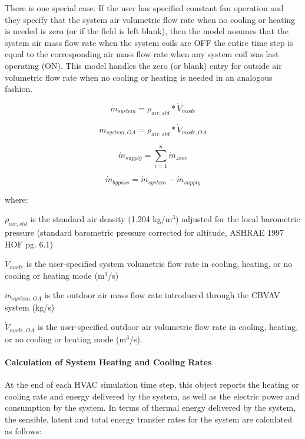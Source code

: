 There is one special case. If the user has specified constant fan operation and they specify that the system air volumetric flow rate when no cooling or heating is needed is zero (or if the field is left blank), then the model assumes that the system air mass flow rate when the system coils are OFF the entire time step is equal to the corresponding air mass flow rate when any system coil was last operating (ON). This model handles the zero (or blank) entry for outside air volumetric flow rate when no cooling or heating is needed in an analogous fashion.

\begin{equation}
{\dot m_{system}} = {\rho_{air,std}}*{\dot V_{mode}}
\end{equation}

\begin{equation}
{\dot m_{system,OA}} = {\rho_{air,std}}*{\dot V_{mode,OA}}
\end{equation}

\begin{equation}
{\dot m_{supply}} = \sum\limits_{i = 1}^n {{{\dot m}_{zone}}}
\end{equation}

\begin{equation}
{\dot m_{bypass}} = {\dot m_{system}} - {\dot m_{supply}}
\end{equation}

where:

\({\rho_{air,std}}\) is the standard air density (1.204 kg/m\(^{3}\)) adjusted for the local barometric pressure (standard barometric pressure corrected for altitude, ASHRAE 1997 HOF pg. 6.1)

\({\dot V_{mode}}\) is the user-specified system volumetric flow rate in cooling, heating, or no cooling or heating mode (m\(^{3}\)/s)

\({\dot m_{system,OA}}\) is the outdoor air mass flow rate introduced through the CBVAV system (kg/s)

\({\dot V_{mode,OA}}\) is the user-specified outdoor air volumetric flow rate in cooling, heating, or no cooling or heating mode (m\(^{3}\)/s).

\paragraph{Calculation of System Heating and Cooling Rates}\label{calculation-of-system-heating-and-cooling-rates}

At the end of each HVAC simulation time step, this object reports the heating or cooling rate and energy delivered by the system, as well as the electric power and consumption by the system. In terms of thermal energy delivered by the system, the sensible, latent and total energy transfer rates for the system are calculated as follows:

